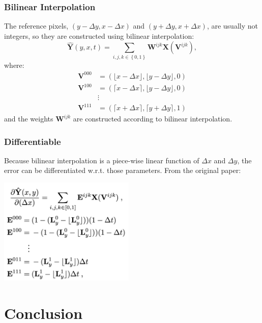\documentclass{beamer}
\begin{document}
\begin{frame}
  \frametitle{Bilinear Interpolation}

  The reference pixels, $\left(y-\Delta y,x-\Delta x\right)$ and
  $\left(y+\Delta y,x+\Delta x\right)$, are usually not integers, so
  they are constructed using bilinear interpolation:
  \begin{displaymath}
    \mathbf{\hat{Y}}(y,x,t) =
    \sum_{i,j,k\in\left\{0,1\right\}}\mathbf{W}^{ijk}\mathbf{X}(\mathbf{V}^{ijk}),
  \end{displaymath}
  where:
  \begin{align*}
    \mathbf{V}^{000}&=\left(\lfloor x-\Delta x\rfloor,\lfloor y-\Delta y\rfloor,0\right)\\
    \mathbf{V}^{100}&=\left(\lceil x-\Delta x\rceil,\lfloor y-\Delta y\rfloor,0\right)\\
    &\vdots\\
    \mathbf{V}^{111}&=\left(\lceil x+\Delta x\rceil,\lceil y+\Delta y\rceil,1\right)
  \end{align*}
  and the weights $\mathbf{W}^{ijk}$ are constructed according to bilinear interpolation.
\end{frame}
    
\begin{frame}
  \frametitle{Differentiable}

  Because bilinear interpolation is a piece-wise linear function of
  $\Delta x$ and $\Delta y$, the error can be differentiated
  w.r.t. those parameters.  From the original paper:
  \centerline{\includegraphics[height=2in]{figs/liu17iccv7.png}}
\end{frame}
    

\section{Conclusion}
\setcounter{subsection}{1}
\end{document}
